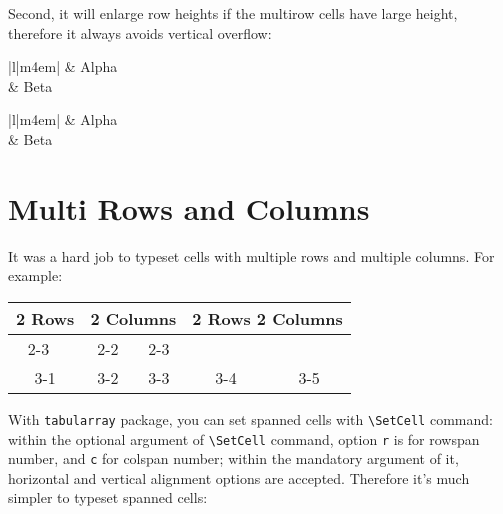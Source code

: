 \documentclass[oneside]{book}
\begin{document}
Second, it will enlarge row heights if the multirow cells have large height,
therefore it always avoids vertical overflow:

\begin{demo}
\begin{tabular}{|l|m{4em}|}
\hline
  & Alpha \\
 & Beta \\
\hline
\end{tabular}
\end{demo}

\begin{demohigh}
\begin{tblr}{|l|m{4em}|}
\hline
  & Alpha \\
 & Beta \\
\hline
\end{tblr}
\end{demohigh}

\section{Multi Rows and Columns}

It was a hard job to typeset cells with multiple rows and multiple columns. For example:

\begin{demo}
\begin{tabular}{|c|c|c|c|c|}
\hline
 \multirow{2}{*}{2 Rows}
     & \multicolumn{2}{c|}{2 Columns}
                 & \multicolumn{2}{c|}{\multirow{2}{*}{2 Rows 2 Columns}} \\
\cline{2-3}
     & 2-2 & 2-3 & \multicolumn{2}{c|}{} \\
\hline
 3-1 & 3-2 & 3-3 & 3-4 & 3-5 \\
\hline
\end{tabular}
\end{demo}

With \verb!tabularray! package, you can set spanned cells with \verb!\SetCell! command:
within the optional argument of \verb!\SetCell! command,
option \verb!r! is for rowspan number, and \verb!c! for colspan number;
within the mandatory argument of it, horizontal and vertical alignment options are accepted.
Therefore it's much simpler to typeset spanned cells:
\end{document}
